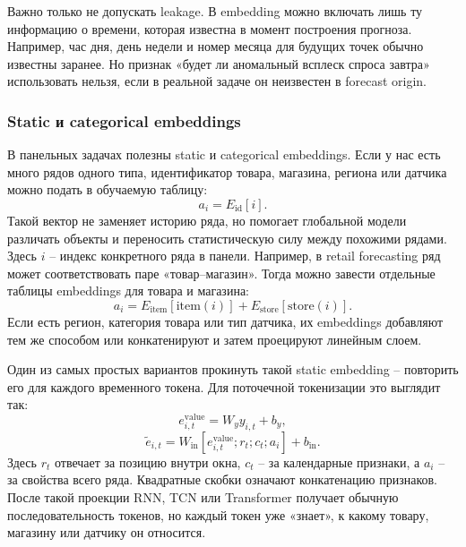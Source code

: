 \documentclass[12pt,fleqn]{article}
\begin{document}
Важно только не допускать leakage.
В embedding можно включать лишь ту информацию о времени, которая известна в момент построения прогноза.
Например, час дня, день недели и номер месяца для будущих точек обычно известны заранее.
Но признак «будет ли аномальный всплеск спроса завтра» использовать нельзя, если в реальной задаче он неизвестен в forecast origin.

\subsubsection{Static и categorical embeddings}

В панельных задачах полезны static и categorical embeddings.
Если у нас есть много рядов одного типа, идентификатор товара, магазина, региона или датчика можно подать в обучаемую таблицу:
\begin{equation}
  a_i = E_{\mathrm{id}}[i].
\end{equation}
Такой вектор не заменяет историю ряда, но помогает глобальной модели различать объекты и переносить статистическую силу между похожими рядами.
Здесь $i$ -- индекс конкретного ряда в панели.
Например, в retail forecasting ряд может соответствовать паре «товар--магазин».
Тогда можно завести отдельные таблицы embeddings для товара и магазина:
\begin{equation}
  a_i =
  E_{\mathrm{item}}[\mathrm{item}(i)]
  +
  E_{\mathrm{store}}[\mathrm{store}(i)].
\end{equation}
Если есть регион, категория товара или тип датчика, их embeddings добавляют тем же способом или конкатенируют и затем проецируют линейным слоем.

Один из самых простых вариантов прокинуть такой static embedding -- повторить его для каждого временного токена.
Для поточечной токенизации это выглядит так:
\begin{equation}
  e_{i,t}^{\mathrm{value}} = W_y y_{i,t} + b_y,
\end{equation}
\begin{equation}
  \widetilde{e}_{i,t}
  =
  W_{\mathrm{in}}
  \left[
    e_{i,t}^{\mathrm{value}};
    r_t;
    c_t;
    a_i
  \right]
  +
  b_{\mathrm{in}}.
\end{equation}
Здесь $r_t$ отвечает за позицию внутри окна, $c_t$ -- за календарные признаки, а $a_i$ -- за свойства всего ряда.
Квадратные скобки означают конкатенацию признаков.
После такой проекции RNN, TCN или Transformer получает обычную последовательность токенов, но каждый токен уже «знает», к какому товару, магазину или датчику он относится.
\end{document}
